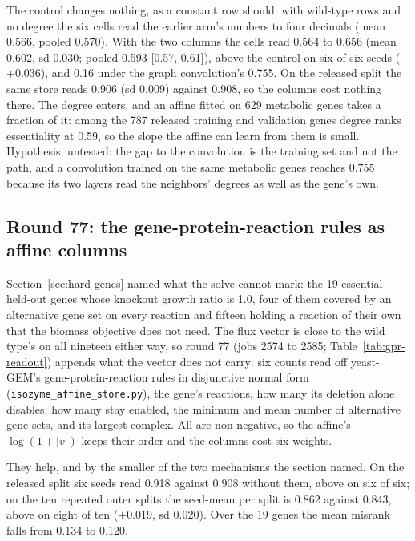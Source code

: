 The control changes nothing, as a constant row should: with wild-type rows and no degree
the six cells read the earlier arm's numbers to four decimals (mean 0.566, pooled 0.570).
With the two columns the cells read 0.564 to 0.656 (mean 0.602, sd 0.030; pooled 0.593
[0.57, 0.61]), above the control on six of six seeds ($+0.036$), and 0.16 under the
graph convolution's 0.755. On the released split the same store reads 0.906 (sd 0.009)
against 0.908, so the columns cost nothing there. The degree enters, and an affine
fitted on 629 metabolic genes takes a fraction of it: among the 787 released training
and validation genes degree ranks essentiality at 0.59, so the slope the affine can learn from them is small. Hypothesis,
untested: the gap to the convolution is the training set and not the path, and a
convolution trained on the same metabolic genes reaches 0.755 because its two layers
read the neighbors' degrees as well as the gene's own.

\subsection{Round 77: the gene-protein-reaction rules as affine columns}
\label{sec:round77}

Section~\ref{sec:hard-genes} named what the solve cannot mark: the 19 essential held-out
genes whose knockout growth ratio is 1.0, four of them covered by an alternative gene set
on every reaction and fifteen holding a reaction of their own that the biomass objective
does not need. The flux vector is close to the wild type's on all nineteen either way, so
round 77 (jobs 2574 to 2585; Table~\ref{tab:gpr-readout}) appends what the vector does not
carry: six counts read off yeast-GEM's gene-protein-reaction rules in disjunctive normal
form (\texttt{isozyme\_affine\_store.py}), the gene's reactions, how many its deletion
alone disables, how many stay enabled, the minimum and mean number of alternative gene
sets, and its largest complex. All are non-negative, so the affine's $\log(1 + |v|)$
keeps their order and the columns cost six weights.

They help, and by the smaller of the two mechanisms the section named. On the released
split six seeds read 0.918 against 0.908 without them, above on six of six; on the ten
repeated outer splits the seed-mean per split is 0.862 against 0.843, above on eight of
ten ($+0.019$, sd 0.020). Over the 19 genes the mean misrank falls from 0.134 to 0.120.

